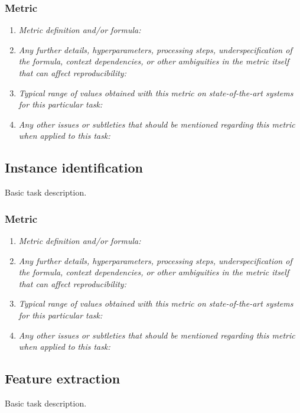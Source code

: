 \documentclass[a4paper,11pt]{article}
\begin{document}
    \subsubsection{Metric}
        \begin{enumerate}[label=\alph*.]
            \item \textit{Metric definition and/or formula:}
            \bigskip
            \item \textit{Any further details, hyperparameters, processing steps, underspecification of the formula, context dependencies, or other ambiguities in the metric itself that can affect reproducibility:}
            \bigskip
            \item \textit{Typical range of values obtained with this metric on state-of-the-art systems for this particular task:}
            \bigskip
            \item \textit{Any other issues or subtleties that should be mentioned regarding this metric when applied to this task:}
            \bigskip
        \end{enumerate}

\subsection{Instance identification}
    Basic task description.
    \subsubsection{Metric}
        \begin{enumerate}[label=\alph*.]
            \item \textit{Metric definition and/or formula:}
            \bigskip
            \item \textit{Any further details, hyperparameters, processing steps, underspecification of the formula, context dependencies, or other ambiguities in the metric itself that can affect reproducibility:}
            \bigskip
            \item \textit{Typical range of values obtained with this metric on state-of-the-art systems for this particular task:}
            \bigskip
            \item \textit{Any other issues or subtleties that should be mentioned regarding this metric when applied to this task:}
            \bigskip
        \end{enumerate}

\subsection{Feature extraction}
    Basic task description.
\end{document}
